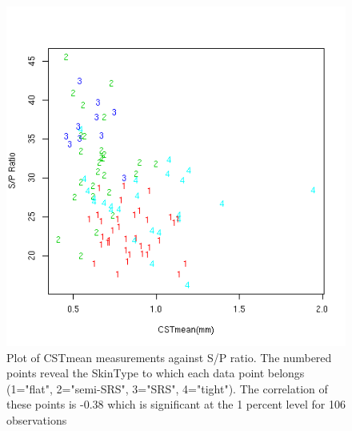 %

\begin{figure}[!h]
  \centering
  \includegraphics[width=1.0\textwidth]{spcstskin.png}
  \caption{Plot of CSTmean measurements against S/P ratio. The numbered points reveal the SkinType to which each data point belongs (1="flat", 2="semi-SRS", 3="SRS", 4="tight"). The correlation of these points is -0.38 which is significant at the 1 percent level for 106 observations}
  \label{fig:spcstskin}
\end{figure}

%

